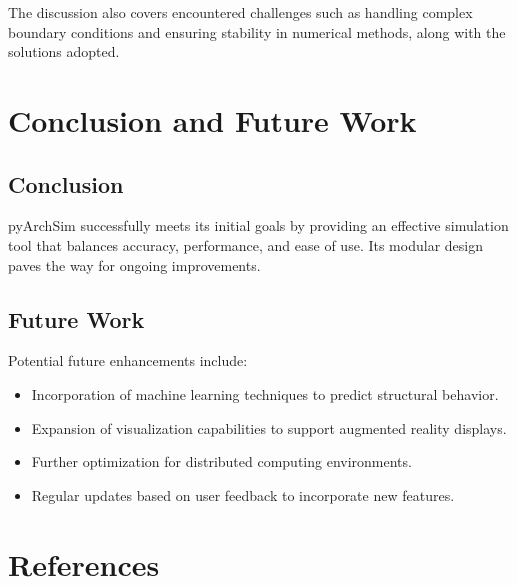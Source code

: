 \documentclass[12pt,a4paper]{report}
\begin{document}
The discussion also covers encountered challenges such as handling complex boundary conditions and ensuring stability in numerical methods, along with the solutions adopted.

\section{Conclusion and Future Work}
\subsection{Conclusion}
pyArchSim successfully meets its initial goals by providing an effective simulation tool that balances accuracy, performance, and ease of use. Its modular design paves the way for ongoing improvements.

\subsection{Future Work}
Potential future enhancements include:
\begin{itemize}
  \item Incorporation of machine learning techniques to predict structural behavior.
  \item Expansion of visualization capabilities to support augmented reality displays.
  \item Further optimization for distributed computing environments.
  \item Regular updates based on user feedback to incorporate new features.
\end{itemize}

\section{References}

\end{document}

